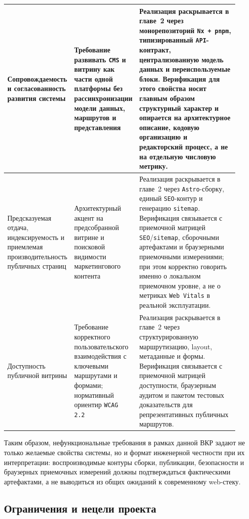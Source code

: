 \begin{longtable}{@{}L{0.23\linewidth}L{0.23\linewidth}L{0.47\linewidth}@{}}
  \midrule
  Сопровождаемость и согласованность развития системы &
  Требование развивать \texttt{CMS} и витрину как части одной платформы без
  рассинхронизации модели данных, маршрутов и представления &
  Реализация раскрывается в главе~2 через монорепозиторий \texttt{Nx + pnpm},
  типизированный \texttt{API}-контракт, централизованную модель данных и переиспользуемые
  блоки. Верификация для этого свойства носит главным образом структурный характер и
  опирается на архитектурное описание, кодовую организацию и редакторский процесс, а не
  на отдельную числовую метрику. \\
  \midrule
  Предсказуемая отдача, индексируемость и приемлемая производительность публичных страниц &
  Архитектурный акцент на предсобранной витрине и поисковой видимости маркетингового
  контента &
  Реализация раскрывается в главе~2 через \texttt{Astro}-сборку, единый \texttt{SEO}-контур
  и генерацию \texttt{sitemap}. Верификация связывается с приемочной матрицей
  \texttt{SEO}/\texttt{sitemap}, сборочными артефактами и браузерными приемочными
  измерениями; при этом корректно говорить именно о локальном приемочном уровне, а не о
  метриках \texttt{Web Vitals} в реальной эксплуатации. \\
  \midrule
  Доступность публичной витрины &
  Требование корректного пользовательского взаимодействия с ключевыми маршрутами и
  формами; нормативный ориентир \texttt{WCAG 2.2}~\cite{wcag22} &
  Реализация раскрывается в главе~2 через структурированную маршрутизацию, layout,
  метаданные и формы. Верификация связывается с приемочной матрицей доступности,
  браузерным аудитом и пакетом тестовых доказательств для репрезентативных публичных
  маршрутов. \\
  \bottomrule
\end{longtable}
\endgroup

Таким образом, нефункциональные требования в рамках данной ВКР задают не только желаемые
свойства системы, но и формат инженерной честности при их интерпретации: воспроизводимые
контуры сборки, публикации, безопасности и браузерных приемочных измерений должны
подтверждаться
фактическими артефактами, а не выводиться из общих ожиданий к современному web-стеку.

\subsection{Ограничения и нецели проекта}

